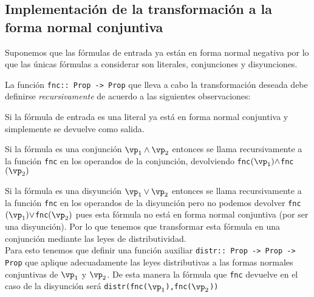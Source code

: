 \documentclass[11pt,letterpaper]{article}
\begin{document}

\subsection{Implementación de la transformación a la forma normal conjuntiva}

Suponemos que las fórmulas de entrada ya están en forma normal negativa por lo 
que las únicas fórmulas a considerar son literales, conjunciones y 
disyunciones.

La función \verb'fnc:: Prop -> Prop' que lleva a cabo la transformación 
deseada debe definirse \textit{recursivamente} de acuerdo a las siguientes 
observaciones:
\bi
 \item Si la fórmula de entrada es una literal ya está en forma normal 
  conjuntiva y simplemente se devuelve como salida.
 \item Si la fórmula es una conjunción $\vp_1\land\vp_2$ entonces se llama 
  recursivamente a la función \verb'fnc' en los operandos de la conjunción, 
  devolviendo \verb'fnc'$(\vp_1)\land$\verb'fnc'$(\vp_2)$
 \item Si la fórmula es una disyunción $\vp_1\lor\vp_2$ entonces se llama 
  recursivamente a la función \verb'fnc' en los operandos de la disyunción pero 
  no podemos devolver \verb'fnc'$(\vp_1)\lor$\verb'fnc'$(\vp_2)$ pues esta 
  fórmula no está en forma normal conjuntiva (por ser una disyunción).
  Por lo que tenemos que transformar esta fórmula en una conjunción mediante 
las   leyes de distributividad. \\
  Para esto tenemos que definir una función auxiliar
  \verb'distr:: Prop -> Prop -> Prop' que aplique adecuadamente las leyes 
  distributivas a las formas normales conjuntivas de $\vp_1$ y $\vp_2$. 
  De esta manera la fórmula que \verb'fnc' devuelve en el caso de la disyunción 
  será \verb'distr(fnc('$\vp_1$\verb'),fnc('$\vp_2$\verb'))'
\ei
\end{document}
